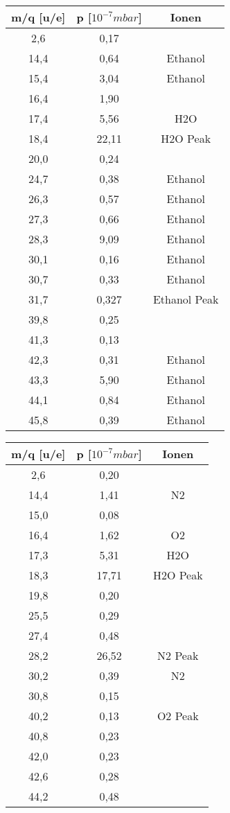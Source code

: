 \begin{center}
\begin{tabular}{c|c|c}
m/q [u/e] & p [$10^{-7} mbar$] & Ionen\\	
\hline	
2,6 &	0,17 &\\
14,4 &	0,64 & Ethanol\\
15,4 &	3,04 & Ethanol\\
16,4 &	1,90 &\\
17,4 &	5,56 & H2O\\
18,4 &	22,11 & H2O Peak\\
20,0 &	0,24 &\\
24,7 &	0,38 & Ethanol\\
26,3 &	0,57 & Ethanol\\
27,3 &	0,66 & Ethanol\\
28,3 &	9,09 & Ethanol\\
30,1 &	0,16 & Ethanol\\
30,7 &	0,33 & Ethanol\\
31,7 &	0,327 & Ethanol Peak\\
39,8 &	0,25 &\\
41,3 &	0,13 &\\
42,3 &	0,31 & Ethanol\\
43,3 &	5,90 & Ethanol\\
44,1 &	0,84 & Ethanol\\
45,8 &	0,39 & Ethanol\\
\end{tabular}
\end{center}


\begin{center}
\begin{tabular}{c|c|c}
m/q [u/e] & p [$10^{-7} mbar$] & Ionen\\	
\hline	
2,6 &	0,20 &\\
14,4 &	1,41 & N2\\
15,0 &	0,08 &\\
16,4 &	1,62 & O2\\
17,3 &	5,31 & H2O\\
18,3 &	17,71 & H2O Peak\\
19,8 &	0,20 &\\
25,5 &	0,29 &\\
27,4 &	0,48 &\\
28,2 &	26,52 & N2 Peak\\
30,2 &	0,39 & N2\\
30,8 &	0,15 &\\
40,2 &	0,13 & O2 Peak\\
40,8 &	0,23 &\\
42,0 &	0,23 &\\
42,6 &	0,28 &\\
44,2 &	0,48 &\\
\end{tabular}
\end{center}

